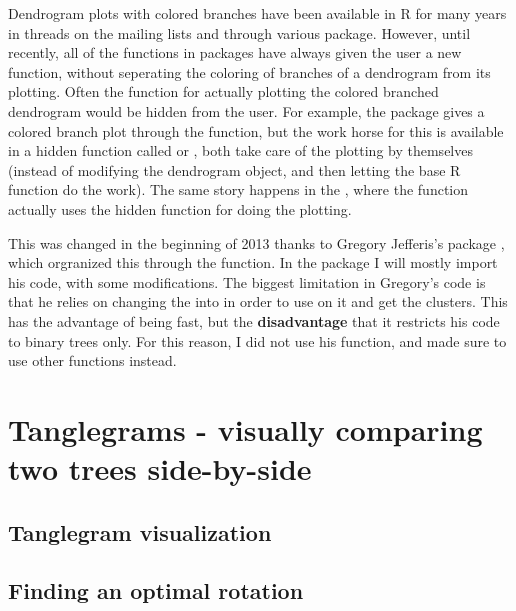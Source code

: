 \documentclass[shortnames,nojss,article]{jss}\usepackage{graphicx, color}
\begin{document}
Dendrogram plots with colored branches have been available in R for many years in threads on the mailing lists and through various package. However, until recently, all of the functions in packages have always given the user a new  function, without seperating the coloring of branches of a dendrogram from its plotting. Often the function for actually plotting the colored branched dendrogram would be hidden from the user. For example, the  package \citep{CRAN:labeltodendro} gives a colored branch plot through the  function, but the work horse for this is available in a hidden function called  or , both take care of the plotting by themselves (instead of modifying the dendrogram object, and then letting the base R function do the work). The same story happens in the  \citep{CRAN:Heatplus}, where the  function actually uses the hidden function  for doing the plotting.

This was changed in the beginning of 2013 thanks to Gregory Jefferis's  package \citep{CRAN:dendroextras}, which orgranized this through the  function. In the  package I will mostly import his code, with some modifications. The biggest limitation in Gregory's code is that he relies on changing the  into  in order to use  on it and get the clusters. This has the advantage of being fast, but the \textbf{disadvantage} that it restricts his code to binary trees only. For this reason, I did not use his  function, and made sure to use other functions instead.






\section{Tanglegrams - visually comparing two trees side-by-side}

\subsection{Tanglegram visualization}

\subsection{Finding an optimal rotation}
\end{document}
